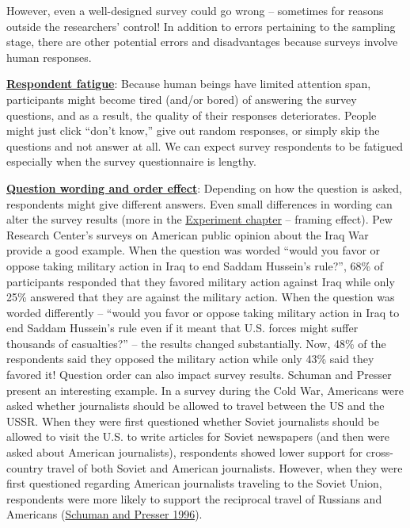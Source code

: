 \documentclass{book}
\begin{document}
However, even a well-designed survey could go wrong -- sometimes for reasons
outside the researchers' control! In addition to errors pertaining to the
sampling stage, there are other potential errors and disadvantages because
surveys involve human responses.

\textbf{\uline{Respondent fatigue}}: Because human beings have limited
attention span, participants might become tired (and/or bored) of answering
the survey questions, and as a result, the quality of their responses
deteriorates. People might just click ``don't know,'' give out random
responses, or simply skip the questions and not answer at all. We can expect
survey respondents to be fatigued especially when the survey questionnaire is
lengthy.

\textbf{\uline{Question wording and order effect}}: Depending on how the
question is asked, respondents might give different answers. Even small
differences in wording can alter the survey results (more in the
\href{./experiments.html}{Experiment chapter} -- framing effect). Pew Research
Center's surveys on American public opinion about the Iraq War provide a good
example. When the question was worded ``would you favor or oppose taking
military action in Iraq to end Saddam Hussein's rule?'', 68\% of participants
responded that they favored military action against Iraq while only 25\%
answered that they are against the military action. When the question was
worded differently -- ``would you favor or oppose taking military action in
Iraq to end Saddam Hussein's rule even if it meant that U.S. forces might
suffer thousands of casualties?'' -- the results changed substantially. Now,
48\% of the respondents said they opposed the military action while only 43\%
said they favored it! Question order can also impact survey results. Schuman
and Presser present an interesting example. In a survey during the Cold War,
Americans were asked whether journalists should be allowed to travel between
the US and the USSR. When they were first questioned whether Soviet
journalists should be allowed to visit the U.S. to write articles for Soviet
newspapers (and then were asked about American journalists), respondents
showed lower support for cross-country travel of both Soviet and American
journalists. However, when they were first questioned regarding American
journalists traveling to the Soviet Union, respondents were more likely to
support the reciprocal travel of Russians and Americans
(\protect\hyperlink{ref-schuman1996questions}{Schuman and Presser 1996}).
\end{document}
